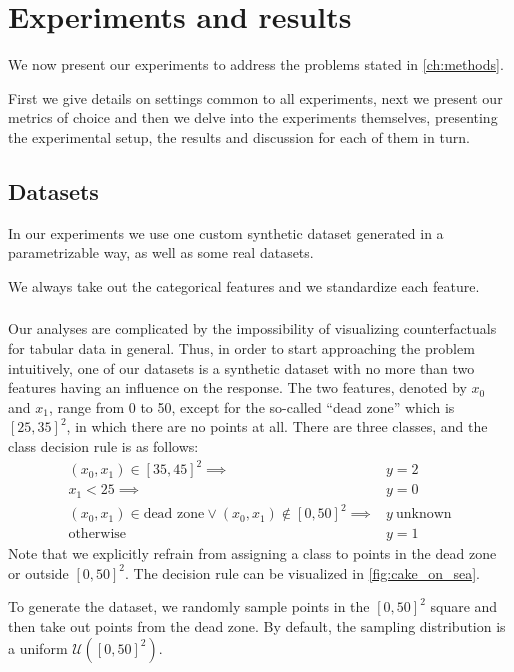 \documentclass[../main.tex]{subfiles}
\begin{document}
\chapter{Experiments and results}

We now present our experiments to address the problems stated in \autoref{ch:methods}.

First we give details on settings common to all experiments, next we present our metrics of choice
and then we delve into the experiments themselves, presenting the experimental setup, the results and
discussion for each of them in turn.

\section{Datasets}
\label{sec:datasets}

In our experiments we use one custom synthetic dataset generated in a parametrizable way, as well as some real datasets.

We always take out the categorical features and we standardize each feature.

\subsection{\CakeOnSea}

Our analyses are complicated by the impossibility of visualizing counterfactuals for tabular data in general.
Thus, in order to start approaching the problem intuitively, one of our datasets is a synthetic dataset with no more than two features having an influence on the response.
The two features, denoted by $x_0$ and $x_1$, range from 0 to 50, except for the so-called ``dead zone'' which is $[25, 35]^2$, in which there are no points at all.
There are three classes, and the class decision rule is as follows:
\begin{align*}
    (x_0, x_1) \in [35, 45]^2 \implies & y = 2 \\
    x_1 < 25                  \implies & y = 0 \\
    (x_0, x_1) \in \text{dead zone} \lor (x_0, x_1) \notin [0, 50]^2  \implies & y\ \text{unknown} \\
    \text{otherwise} \qquad            & y = 1
\end{align*}
Note that we explicitly refrain from assigning a class to points in the dead zone or outside $[0, 50]^2$.
The decision rule can be visualized in \autoref{fig:cake_on_sea}.

To generate the dataset, we randomly sample points in the $[0, 50]^2$ square and then take out points from the dead zone. By default, the sampling distribution is a uniform $\mathcal{U}([0, 50]^2)$.
\end{document}
